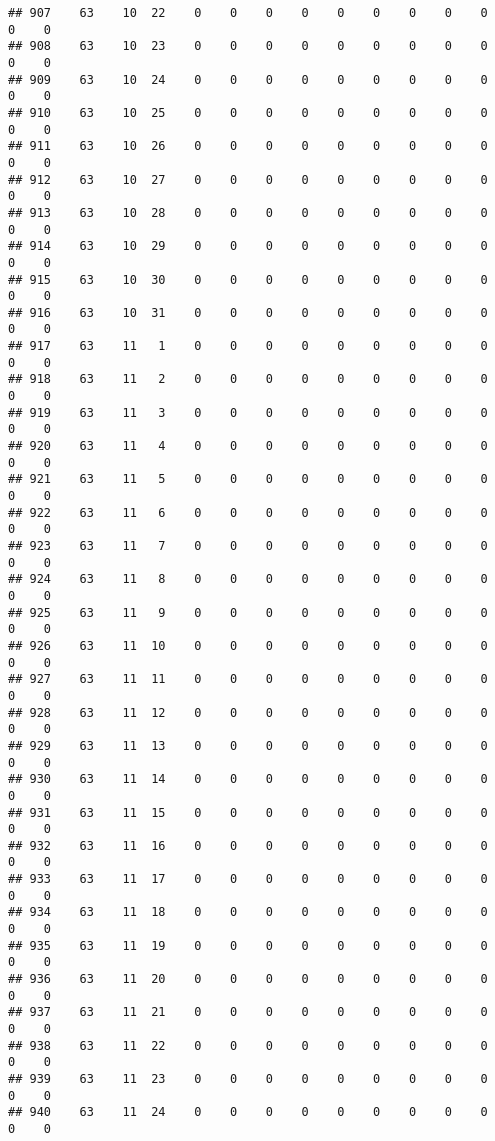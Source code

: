 \documentclass[]{article}
\begin{document}
\begin{verbatim}
## 907    63    10  22    0    0    0    0    0    0    0    0    0    0    0
## 908    63    10  23    0    0    0    0    0    0    0    0    0    0    0
## 909    63    10  24    0    0    0    0    0    0    0    0    0    0    0
## 910    63    10  25    0    0    0    0    0    0    0    0    0    0    0
## 911    63    10  26    0    0    0    0    0    0    0    0    0    0    0
## 912    63    10  27    0    0    0    0    0    0    0    0    0    0    0
## 913    63    10  28    0    0    0    0    0    0    0    0    0    0    0
## 914    63    10  29    0    0    0    0    0    0    0    0    0    0    0
## 915    63    10  30    0    0    0    0    0    0    0    0    0    0    0
## 916    63    10  31    0    0    0    0    0    0    0    0    0    0    0
## 917    63    11   1    0    0    0    0    0    0    0    0    0    0    0
## 918    63    11   2    0    0    0    0    0    0    0    0    0    0    0
## 919    63    11   3    0    0    0    0    0    0    0    0    0    0    0
## 920    63    11   4    0    0    0    0    0    0    0    0    0    0    0
## 921    63    11   5    0    0    0    0    0    0    0    0    0    0    0
## 922    63    11   6    0    0    0    0    0    0    0    0    0    0    0
## 923    63    11   7    0    0    0    0    0    0    0    0    0    0    0
## 924    63    11   8    0    0    0    0    0    0    0    0    0    0    0
## 925    63    11   9    0    0    0    0    0    0    0    0    0    0    0
## 926    63    11  10    0    0    0    0    0    0    0    0    0    0    0
## 927    63    11  11    0    0    0    0    0    0    0    0    0    0    0
## 928    63    11  12    0    0    0    0    0    0    0    0    0    0    0
## 929    63    11  13    0    0    0    0    0    0    0    0    0    0    0
## 930    63    11  14    0    0    0    0    0    0    0    0    0    0    0
## 931    63    11  15    0    0    0    0    0    0    0    0    0    0    0
## 932    63    11  16    0    0    0    0    0    0    0    0    0    0    0
## 933    63    11  17    0    0    0    0    0    0    0    0    0    0    0
## 934    63    11  18    0    0    0    0    0    0    0    0    0    0    0
## 935    63    11  19    0    0    0    0    0    0    0    0    0    0    0
## 936    63    11  20    0    0    0    0    0    0    0    0    0    0    0
## 937    63    11  21    0    0    0    0    0    0    0    0    0    0    0
## 938    63    11  22    0    0    0    0    0    0    0    0    0    0    0
## 939    63    11  23    0    0    0    0    0    0    0    0    0    0    0
## 940    63    11  24    0    0    0    0    0    0    0    0    0    0    0

\end{verbatim}
\end{document}
